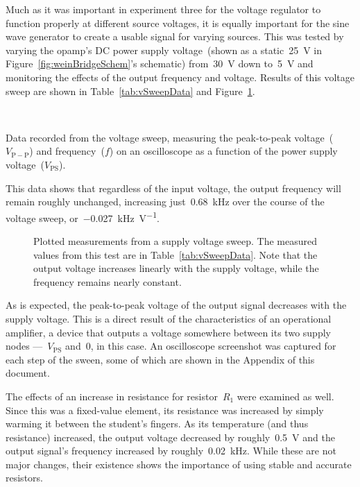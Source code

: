 Much as it was important in experiment three for the voltage regulator to
function properly at different source voltages, it is equally important for the
sine wave generator to create a usable signal for varying sources.  This was
tested by varying the opamp's DC power supply voltage~(shown as a
static~\SI{25}{\volt} in Figure~\ref{fig:weinBridgeSchem}'s schematic)
from~\SI{30}{\volt} down to~\SI{5}{\volt} and monitoring the effects of the
output frequency and voltage.  Results of this voltage sweep are shown in
Table~\ref{tab:vSweepData} and Figure~\ref{fig:vSweepPlot}.
%
\begin{table}[H]
	\centering
	\\
	\parbox{.6\textwidth}{
	\caption[Voltage Sweep Data]{Data recorded from the voltage sweep,
		measuring the peak-to-peak voltage~($V_\mathrm{P-P}$) and
		frequency~($f$) on an oscilloscope as a function of the power supply
		voltage~($V_\mathrm{PS}$).}
	\label{tab:vSweepData}}
\end{table}
%
This data shows that regardless of the input voltage, the output frequency will
remain roughly unchanged, increasing just~\SI{0.68}{\kilo\hertz} over the
course of the voltage sweep, or~\SI{-0.027}{\kilo\hertz\per\volt}.
%
\begin{figure}[H]
	\centering
	
	\parbox{4.25in}{
	\caption[Voltage Sweep Plot]{Plotted measurements from a supply voltage
	sweep.  The measured values from this test are in
	Table~\ref{tab:vSweepData}.  Note that the output voltage increases
	linearly with the supply voltage, while the frequency remains nearly
	constant.}
	\label{fig:vSweepPlot}}
\end{figure}
%
As is expected, the peak-to-peak voltage of the output signal decreases with
the supply voltage.  This is a direct result of the characteristics of an
operational amplifier, a device that outputs a voltage somewhere between its
two supply nodes ---~$V_\text{PS}$ and~0, in this case.  An oscilloscope
screenshot was captured for each step of the sween, some of which are shown in
the Appendix  of this document.


The effects of an increase in resistance for resistor~$R_1$ were examined as
well.  Since this was a fixed-value element, its resistance was increased by
simply warming it between the student's fingers.  As its temperature (and thus
resistance) increased, the output voltage decreased by roughly~\SI{0.5}{\volt}
and the output signal's frequency increased by roughly~\SI{0.02}{\kilo\hertz}.
While these are not major changes, their existence shows the importance of
using stable and accurate resistors.


